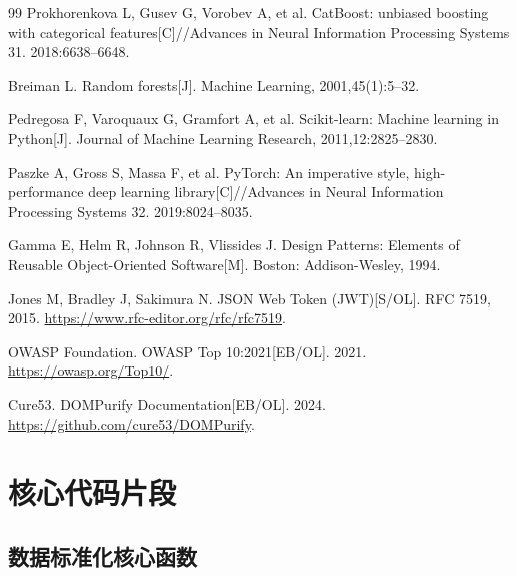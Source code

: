 \documentclass[12pt,a4paper]{ctexbook}
\begin{document}
\begin{thebibliography}{99}
Prokhorenkova L, Gusev G, Vorobev A, et al. CatBoost: unbiased boosting with categorical features[C]//Advances in Neural Information Processing Systems 31. 2018:6638--6648.

Breiman L. Random forests[J]. Machine Learning, 2001,45(1):5--32.

Pedregosa F, Varoquaux G, Gramfort A, et al. Scikit-learn: Machine learning in Python[J]. Journal of Machine Learning Research, 2011,12:2825--2830.

Paszke A, Gross S, Massa F, et al. PyTorch: An imperative style, high-performance deep learning library[C]//Advances in Neural Information Processing Systems 32. 2019:8024--8035.

Gamma E, Helm R, Johnson R, Vlissides J. Design Patterns: Elements of Reusable Object-Oriented Software[M]. Boston: Addison-Wesley, 1994.

Jones M, Bradley J, Sakimura N. JSON Web Token (JWT)[S/OL]. RFC 7519, 2015. \url{https://www.rfc-editor.org/rfc/rfc7519}.

OWASP Foundation. OWASP Top 10:2021[EB/OL]. 2021. \url{https://owasp.org/Top10/}.

Cure53. DOMPurify Documentation[EB/OL]. 2024. \url{https://github.com/cure53/DOMPurify}.

\end{thebibliography}

\appendix
\chapter{核心代码片段}

\section{数据标准化核心函数}
\end{document}
